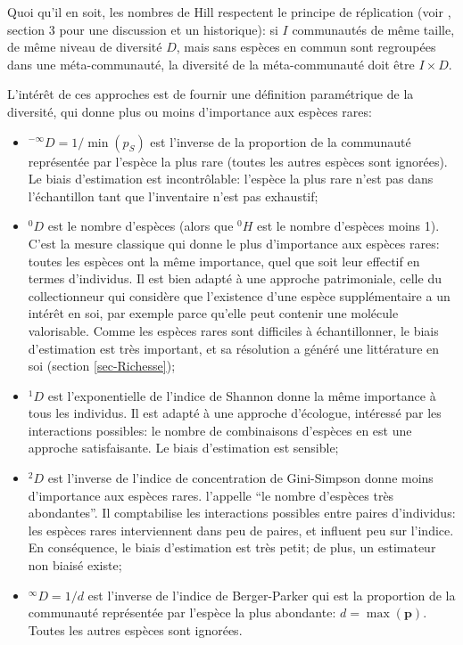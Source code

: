 \documentclass[
  11pt,
  american,
  a4paper,
  extrafontsizes,onecolumn,openright
  ]{memoir}
\providecommand{\tightlist}{%
  \setlength{\itemsep}{0pt}\setlength{\parskip}{0pt}}
\begin{document}
Quoi qu'il en soit, les nombres de Hill respectent le principe de réplication (voir \textcite{Chao2010}, section 3 pour une discussion et un historique): si \(I\) communautés de même taille, de même niveau de diversité \(D\), mais sans espèces en commun sont regroupées dans une méta-communauté, la diversité de la méta-communauté doit être \(I \times D\).

L'intérêt de ces approches est de fournir une définition paramétrique de la diversité, qui donne plus ou moins d'importance aux espèces rares:

\begin{itemize}
\tightlist
\item
  \(^{-\infty}\!D = {1} / {\min(p_S)}\) est l'inverse de la proportion de la communauté représentée par l'espèce la plus rare (toutes les autres espèces sont ignorées).
  Le biais d'estimation est incontrôlable: l'espèce la plus rare n'est pas dans l'échantillon tant que l'inventaire n'est pas exhaustif;
\item
  \(^{0}\!D\) est le nombre d'espèces (alors que \(^{0}\!H\) est le nombre d'espèces moins 1).
  C'est la mesure classique qui donne le plus d'importance aux espèces rares: toutes les espèces ont la même importance, quel que soit leur effectif en termes d'individus.
  Il est bien adapté à une approche patrimoniale, celle du collectionneur qui considère que l'existence d'une espèce supplémentaire a un intérêt en soi, par exemple parce qu'elle peut contenir une molécule valorisable.
  Comme les espèces rares sont difficiles à échantillonner, le biais d'estimation est très important, et sa résolution a généré une littérature en soi (section \ref{sec-Richesse});
\item
  \(^{1}\!D\) est l'exponentielle de l'indice de Shannon donne la même importance à tous les individus.
  Il est adapté à une approche d'écologue, intéressé par les interactions possibles: le nombre de combinaisons d'espèces en est une approche satisfaisante.
  Le biais d'estimation est sensible;
\item
  \(^{2}\!D\) est l'inverse de l'indice de concentration de Gini-Simpson donne moins d'importance aux espèces rares.
  \textcite{Hill1973} l'appelle \enquote{le nombre d'espèces très abondantes}.
  Il comptabilise les interactions possibles entre paires d'individus: les espèces rares interviennent dans peu de paires, et influent peu sur l'indice.
  En conséquence, le biais d'estimation est très petit; de plus, un estimateur non biaisé existe;
\item
  \(^{\infty}\!D = {1} / {d}\) est l'inverse de l'indice de Berger-Parker \autocite{Berger1970} qui est la proportion de la communauté représentée par l'espèce la plus abondante: \(d = \max(\mathbf{p})\).
  Toutes les autres espèces sont ignorées.
\end{itemize}
\end{document}
